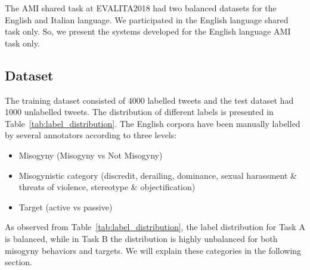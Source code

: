 \documentclass[11pt]{article}
\begin{document}
The AMI shared task at EVALITA2018 had two balanced datasets for the English and Italian language. We participated in the English language shared task only. So, we present the systems developed for the English language AMI task only.

\subsection{Dataset}
The training dataset consisted of 4000 labelled tweets and the test dataset had 1000 unlabelled tweets. The distribution of different labels is presented in Table~\ref{tab:label_distribution}.
The English corpora have been manually labelled by several annotators according to three levels:
\begin{itemize}
    \item     Misogyny (Misogyny vs Not Misogyny)
    \item Misogynistic category (discredit, derailing, dominance, sexual harassment \& threats of violence, stereotype \& objectification)
    \item Target (active vs passive)
\end{itemize}

As observed from Table~\ref{tab:label_distribution}, the label distribution for Task A is balanced, while in Task B the
distribution is highly unbalanced for both misogyny behaviors and targets. We will explain these categories in the following section.



\begin{table}[!htbp]
	
	\caption{The distribution of different labels in the English language dataset.}
	~\label{tab:label_distribution}
\end{table}
\end{document}
